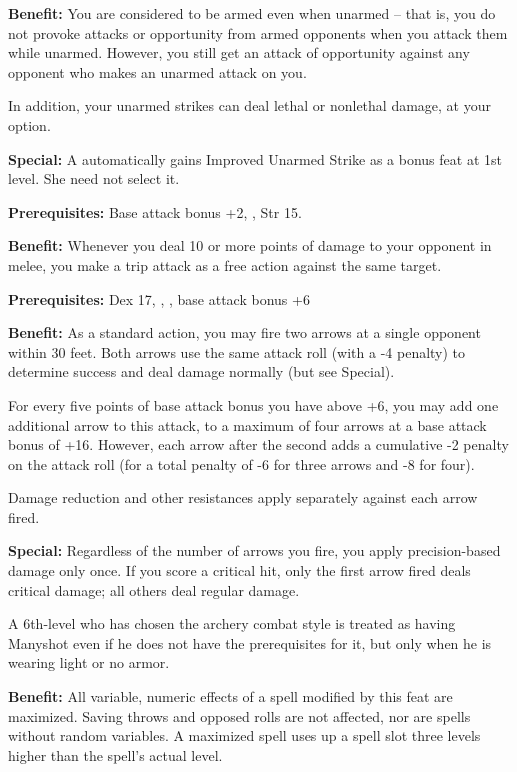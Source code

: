 \textbf{Benefit:} You are considered to be armed even when unarmed  -- that is, you do not provoke attacks or opportunity from armed opponents when you attack them while unarmed. However, you still get an attack of opportunity against any opponent who makes an unarmed attack on you.

In addition, your unarmed strikes can deal lethal or nonlethal damage, at your option.

\textbf{Special:} A  automatically gains Improved Unarmed Strike as a bonus feat at 1st level. She need not select it.


\textbf{Prerequisites:} Base attack bonus +2, , Str 15.

\textbf{Benefit:} Whenever you deal 10 or more points of damage to your opponent in melee, you make a trip attack as a free action against the same target.


\textbf{Prerequisites:} Dex 17, , , base attack bonus 
+6

\textbf{Benefit:} As a standard action, you may fire two arrows at a single opponent within 30 feet. Both arrows use the same attack roll (with a -4 penalty) to determine success and deal damage normally (but see Special).

For every five points of base attack bonus you have above +6, you may add one additional arrow to this attack, to a maximum of four arrows at a base attack bonus of +16. However, each arrow after the second adds a cumulative -2 penalty on the attack roll (for a total penalty of -6 for three arrows and -8 for four).

Damage reduction and other resistances apply separately against each arrow fired.

\textbf{Special:} Regardless of the number of arrows you fire, you apply precision-based damage only once. If you score a critical hit, only the first arrow fired deals critical damage; all others deal regular damage.

A 6th-level  who has chosen the archery combat style is treated as having Manyshot even if he does not have the prerequisites for it, but only when he is wearing light or no armor.


\textbf{Benefit:} All variable, numeric effects of a spell modified by this feat are maximized. Saving throws and opposed rolls are not affected, nor are spells without random variables. A maximized spell uses up a spell slot three levels higher than the spell's actual level.


